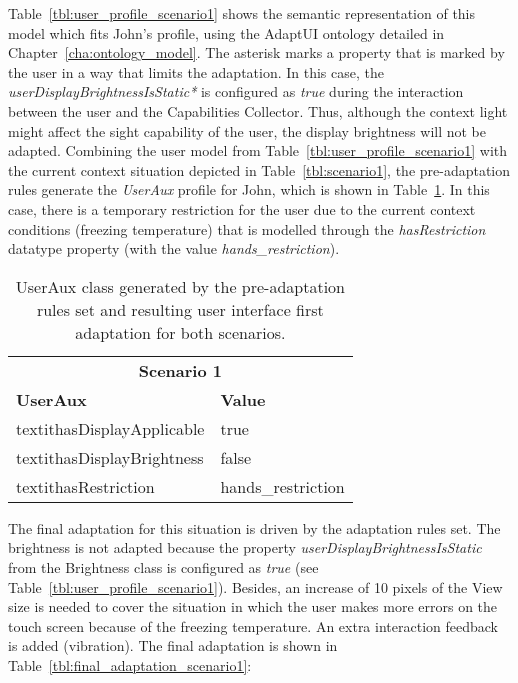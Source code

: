 Table~\ref{tbl:user_profile_scenario1} shows the semantic representation of 
this model which fits John’s profile, using the AdaptUI ontology detailed in 
Chapter~\ref{cha:ontology_model}. The asterisk marks a property that is marked by the 
user in a way that limits the adaptation. In this case, the 
\textit{userDisplayBrightnessIsStatic*} is configured as \textit{true} during 
the interaction between the user and the Capabilities Collector. Thus, although 
the context light might affect the sight capability of the user, the display 
brightness will not be adapted. Combining the user model from 
Table~\ref{tbl:user_profile_scenario1} with the current context situation
depicted in Table~\ref{tbl:scenario1}, the pre-adaptation rules generate the
\textit{UserAux} profile for John, which is shown in 
Table~\ref{tbl:userAux_scenario1}. In this case, there is a temporary 
restriction for the user due to the current context conditions (freezing 
temperature) that is modelled through the \textit{hasRestriction} datatype 
property (with the value \textit{hands\_restriction}). 

\begin{table}
 \caption{UserAux class generated by the pre-adaptation rules set and resulting
 user interface first adaptation for both scenarios.}
 \label{tbl:userAux_scenario1}
 \footnotesize
 \centering
\begin{tabular}{l l}
  \hline 
  \multicolumn{2}{c}{\textbf{Scenario 1}}	\\
  \textbf{UserAux} 	& \textbf{Value}	\\
  \hline
  textit{hasDisplayApplicable} 	& true			\\
  textit{hasDisplayBrightness}	& false			\\
  textit{hasRestriction}	& hands\_restriction	\\
  \hline
\end{tabular}
\end{table}

The final adaptation for this situation is driven by the adaptation rules set.
The brightness is not adapted because the property 
\textit{userDisplayBrightnessIsStatic} from the Brightness class is configured 
as \textit{true} (see Table~\ref{tbl:user_profile_scenario1}). Besides, an 
increase of 10 pixels of the View size is needed to cover the situation in 
which the user makes more errors on the touch screen because of the freezing
temperature. An extra interaction feedback is added (vibration). The final 
adaptation is shown in Table~\ref{tbl:final_adaptation_scenario1}:

